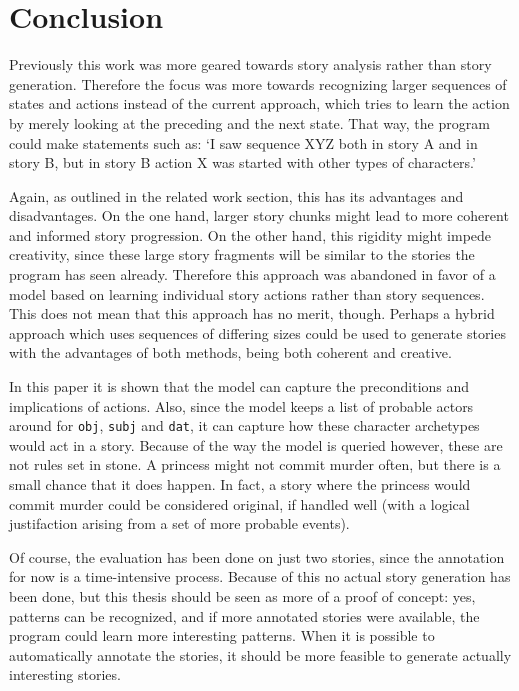 \section{Conclusion}

Previously this work was more geared towards story analysis rather than story
generation. Therefore the focus was more towards recognizing larger sequences of
states and actions instead of the current approach, which tries to learn the
action by merely looking at the preceding and the next state. That way, the program could make statements
such as: `I saw sequence XYZ both in story A and in story B, but in story B action X
was started with other types of characters.'

Again, as outlined in the related work
section, this has its advantages and disadvantages. On the one hand, larger story
chunks might lead to more coherent and informed story progression. On the other
hand, this rigidity might impede creativity, since these large story fragments
will be similar to the stories the program has seen already. Therefore this
approach was abandoned in favor of a model based on learning individual story
actions rather than story sequences. This does not mean that this approach has
no merit, though. Perhaps a hybrid approach which uses
sequences of differing sizes could be used to generate stories with the
advantages of both methods, being both coherent and creative.

In this paper it is shown that the model can capture the preconditions and
implications of actions. Also, since the model keeps a list of probable actors
around for \texttt{obj}, \texttt{subj} and \texttt{dat},
it can capture how these character archetypes would act in a story. Because of the
way the model is queried however, these are not rules set in stone. A princess
might not commit murder often, but there is a small chance that it does happen. In
fact, a story where the princess would commit murder could be considered original, if
handled well (with a logical justifaction arising from a set of more probable
events).

Of course, the evaluation has been done on just two stories, since the
annotation for now is a time-intensive process. Because of this no actual story
generation has been done, but this thesis should be seen as more of a proof of
concept: yes, patterns can be recognized, and if more annotated stories were
available, the program could learn more interesting patterns. When it is
possible to automatically annotate the stories, it should be more feasible to
generate actually interesting stories.

